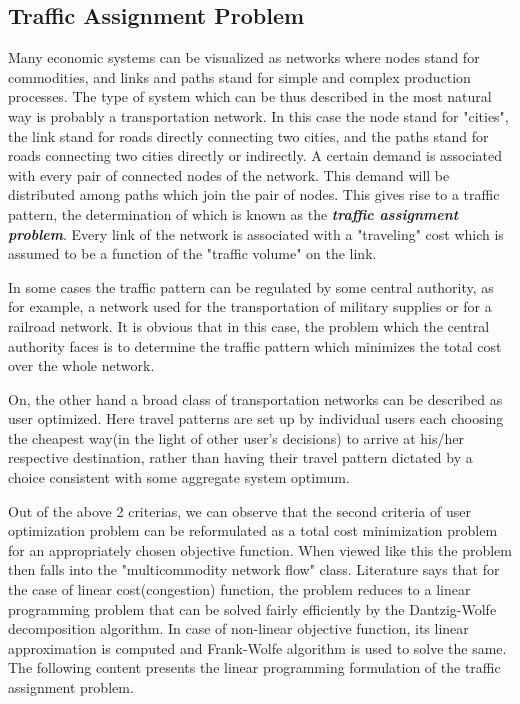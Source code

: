 \documentclass[a4paper, 12pt]{article}
\begin{document}
\subsection{Traffic Assignment Problem}
Many economic systems can be visualized as networks where nodes stand for commodities, and links and paths stand for simple and complex production processes. The type of system which can be thus described in the most natural way is probably a transportation network. In this case the node stand for "cities", the link stand for roads directly connecting two cities, and the paths stand for roads connecting two cities directly or indirectly. A certain demand is associated with every pair of connected nodes of the network. This demand will be distributed among paths which join the pair of nodes. This gives rise to a traffic pattern, the determination of which is known as the \textbf{\textit{traffic assignment problem}}. Every link of the network is associated with a "traveling" cost which is assumed to be a function of the "traffic volume" on the link.\\ \par
\noindent
In some cases the traffic pattern can be regulated by some central authority, as for example, a network used for the transportation of military supplies or for a railroad network. It is obvious that in this case, the problem which the central authority faces is to determine the traffic pattern which minimizes the total cost over the whole network.\\ \par
\noindent
On, the other hand a broad class of transportation networks can be described as user optimized. Here travel patterns are set up by individual users each choosing the cheapest way(in the light of other user's decisions) to arrive at his/her respective destination, rather than having their travel pattern dictated by a choice consistent with some aggregate system optimum.\\ \par
\noindent
Out of the above 2 criterias, we can observe that the second criteria of user optimization problem can be reformulated as a total cost minimization problem for an appropriately chosen objective function. When viewed like this the problem then falls into the "multicommodity network flow" class. Literature says that for the case of linear cost(congestion) function, the problem reduces to a linear programming problem that can be solved fairly efficiently by the Dantzig-Wolfe decomposition algorithm. In case of non-linear objective function, its linear approximation is computed and Frank-Wolfe algorithm is used to solve the same. The following content presents the linear programming formulation of the traffic assignment problem.\\~\\
\end{document}
